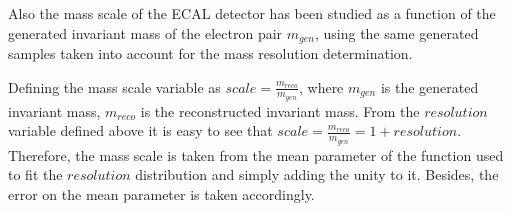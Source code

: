 %
%
%
%
%
%
\medskip
Also the mass scale of the ECAL detector has been studied as a function of the generated invariant mass of the electron pair $m_{gen}$, using the same generated samples taken into account for the mass resolution determination.

Defining the mass scale variable as $scale =\frac{m_{reco}}{m_{gen}}$, where $m_{gen}$ is the generated invariant mass, $m_{reco}$ is the reconstructed invariant mass. From the $resolution$ variable defined above it is easy to see that $scale= \frac{m_{reco}}{m_{gen}}= 1 + resolution$.
Therefore, the mass scale is taken from the mean parameter of the function used to fit the $resolution$ distribution and simply adding the unity to it. Besides, the error on the mean parameter is taken accordingly.

